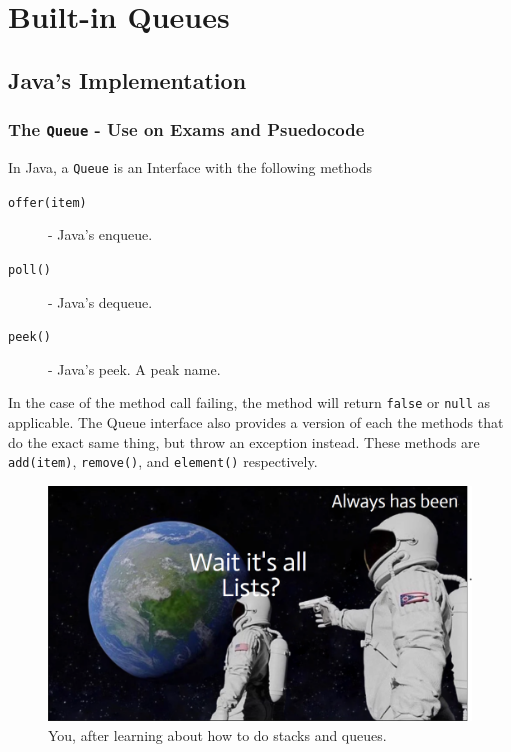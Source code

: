 \section{Built-in Queues}
\subsection{Java's Implementation}

\subsubsection{The \texttt{Queue} - Use on Exams and Psuedocode}
In Java, a \texttt{Queue} is an Interface with the following methods

\begin{description}
	\item[\texttt{offer(item)}] - Java's enqueue.
	\item[\texttt{poll()}] - Java's dequeue.
	\item[\texttt{peek()}] - Java's peek.  A peak name.
\end{description}

In the case of the method call failing, the method will return \texttt{false} or \texttt{null} as applicable.  The Queue interface also provides a version of each the methods that do the exact same thing, but throw an exception instead.  These methods are \texttt{add(item)}, \texttt{remove()}, and \texttt{element()} respectively. 




\begin{figure}
	\centering
	\includegraphics[width=\linewidth]{pics/waitQueuesAreLists}
	\caption{You, after learning about how to do stacks and queues.}
	\label{fig:waitqueuesarelists}
\end{figure}

